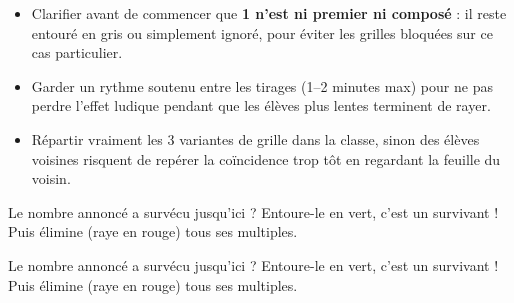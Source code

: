 \begin{tcolorbox}[colback=white, colframe=themeColor, title=Points de vigilance, fonttitle=\bfseries]
\begin{itemize}
\item Clarifier avant de commencer que \textbf{1 n'est ni premier ni composé} : il reste entouré en gris ou simplement ignoré, pour éviter les grilles bloquées sur ce cas particulier.
\item Garder un rythme soutenu entre les tirages (1--2 minutes max) pour ne pas perdre l'effet ludique pendant que les élèves plus lent\textperiodcentered es terminent de rayer.
\item Répartir vraiment les 3 variantes de grille dans la classe, sinon des élèves voisin\textperiodcentered es risquent de repérer la coïncidence trop tôt en regardant la feuille du voisin.
\end{itemize}
\end{tcolorbox}

\clearpage


Le nombre annoncé a survécu jusqu'ici ? Entoure-le en vert, c'est un survivant ! Puis élimine (raye en rouge) tous ses multiples.

\vfill
\begin{center}
\end{center}
\vfill

\newpage

Le nombre annoncé a survécu jusqu'ici ? Entoure-le en vert, c'est un survivant ! Puis élimine (raye en rouge) tous ses multiples.


\vfill
\begin{center}
\end{center}
\vfill

